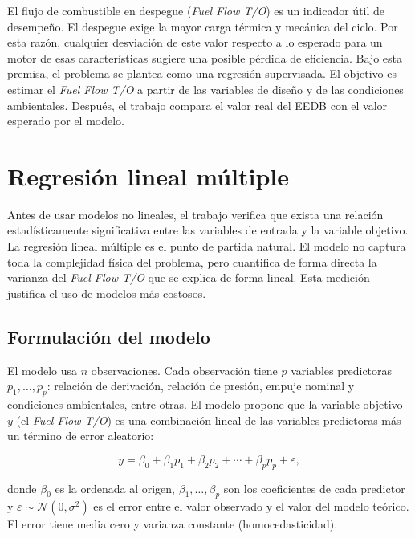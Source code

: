 El flujo de combustible en despegue (\textit{Fuel Flow T/O}) es un indicador útil de desempeño. El despegue exige la mayor carga térmica y mecánica del ciclo. Por esta razón, cualquier desviación de este valor respecto a lo esperado para un motor de esas características sugiere una posible pérdida de eficiencia. Bajo esta premisa, el problema se plantea como una regresión supervisada. El objetivo es estimar el \textit{Fuel Flow T/O} a partir de las variables de diseño y de las condiciones ambientales. Después, el trabajo compara el valor real del EEDB con el valor esperado por el modelo.

\section{Regresión lineal múltiple}
\label{sec:regresion_multiple}

Antes de usar modelos no lineales, el trabajo verifica que exista una relación estadísticamente significativa entre las variables de entrada y la variable objetivo. La regresión lineal múltiple es el punto de partida natural. El modelo no captura toda la complejidad física del problema, pero cuantifica de forma directa la varianza del \textit{Fuel Flow T/O} que se explica de forma lineal. Esta medición justifica el uso de modelos más costosos.

\subsection{Formulación del modelo}

El modelo usa $n$ observaciones. Cada observación tiene $p$ variables predictoras $p_1,\dots,p_p$: relación de derivación, relación de presión, empuje nominal y condiciones ambientales, entre otras. El modelo propone que la variable objetivo $y$ (el \textit{Fuel Flow T/O}) es una combinación lineal de las variables predictoras más un término de error aleatorio:

\begin{equation}
y = \beta_0 + \beta_1 p_1 + \beta_2 p_2 + \cdots + \beta_p p_p + \varepsilon,
\label{eq:regresion_multiple}
\end{equation}

donde $\beta_0$ es la ordenada al origen, $\beta_1,\dots,\beta_p$ son los coeficientes de cada predictor y $\varepsilon \sim \mathcal{N}(0,\sigma^2)$ es el error entre el valor observado y el valor del modelo teórico. El error tiene media cero y varianza constante (homocedasticidad).

